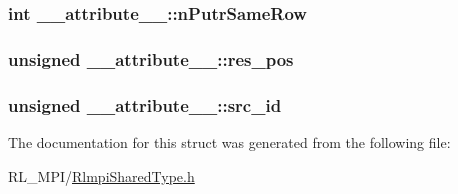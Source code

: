 \label{struct____attribute_____aca7a5080435e36e62172756495e61b3b}
\hypertarget{struct____attribute_____ac39c8684fd7d72438a65c2a17976e3b3}{
\subsubsection[{nPutrSameRow}]{\setlength{\rightskip}{0pt plus 5cm}int {\bf \_\-\_\-attribute\_\-\_\-::nPutrSameRow}}}
\label{struct____attribute_____ac39c8684fd7d72438a65c2a17976e3b3}
\hypertarget{struct____attribute_____a5520bd158c9067709c4581ee299ffb68}{
\subsubsection[{res\_\-pos}]{\setlength{\rightskip}{0pt plus 5cm}unsigned {\bf \_\-\_\-attribute\_\-\_\-::res\_\-pos}}}
\label{struct____attribute_____a5520bd158c9067709c4581ee299ffb68}
\hypertarget{struct____attribute_____ab5ad54f2c28857af1bdac6584a3a1968}{
\subsubsection[{src\_\-id}]{\setlength{\rightskip}{0pt plus 5cm}unsigned {\bf \_\-\_\-attribute\_\-\_\-::src\_\-id}}}
\label{struct____attribute_____ab5ad54f2c28857af1bdac6584a3a1968}


The documentation for this struct was generated from the following file:\begin{DoxyCompactItemize}
\item 
RL\_\-MPI/\hyperlink{RlmpiSharedType_8h}{RlmpiSharedType.h}\end{DoxyCompactItemize}
